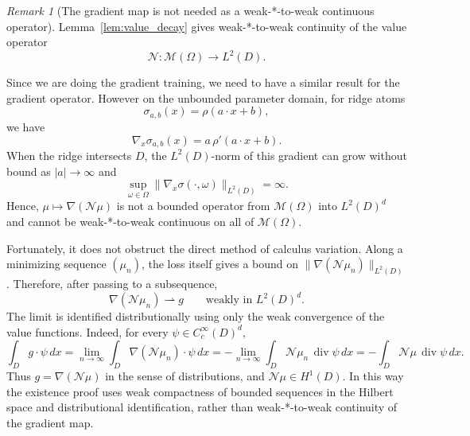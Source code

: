 \documentclass[11pt]{amsart}
\theoremstyle{definition}
\theoremstyle{remark}
\newtheorem{remark}[theorem]{Remark}
\begin{document}
\begin{remark}[The gradient map is not needed as a weak-*-to-weak continuous operator]
Lemma~\ref{lem:value_decay} gives weak-*-to-weak continuity of the value
operator
\begin{equation*}
\mathcal{N} : \mathcal{M}(\Omega) \to L^2(D).
\end{equation*}

Since we are doing the gradient training, we need to have a similar result for the gradient operator. 
However on the unbounded parameter domain, for ridge atoms
\begin{equation*}
\sigma_{a,b}(x) = \rho(a\cdot x+b),
\end{equation*}
we have
\begin{equation*}
\nabla_x \sigma_{a,b}(x) = a\,\rho'(a\cdot x+b).
\end{equation*}
When the ridge intersects $D$, the $L^2(D)$-norm of this gradient can grow
without bound as $|a|\to\infty$ and 
\begin{equation*}
\sup_{\omega\in\Omega}
\|\nabla_x\sigma(\cdot,\omega)\|_{L^2(D)} = \infty.
\end{equation*}
Hence, $\mu \mapsto \nabla(\mathcal{N}\mu)$ is not a bounded operator from
$\mathcal{M}(\Omega)$ into $L^2(D)^d$ and cannot be weak-*-to-weak
continuous on all of $\mathcal{M}(\Omega)$.

Fortunately, it does not obstruct the direct method of calculus variation.  
Along a minimizing sequence $(\mu_n)$, the loss itself gives a bound on
$\|\nabla(\mathcal{N}\mu_n)\|_{L^2(D)}$.  
Therefore, after passing to a subsequence,
\begin{equation*}
\nabla(\mathcal{N}\mu_n) \rightharpoonup g
\qquad \text{weakly in } L^2(D)^d .
\end{equation*}
The limit is identified distributionally using only the weak convergence of the
value functions.  Indeed, for every $\psi \in C_c^\infty(D)^d$,
\begin{equation*}
\int_D g \cdot \psi \, dx
= \lim_{n\to\infty} \int_D \nabla(\mathcal{N}\mu_n)\cdot \psi \, dx
= -\lim_{n\to\infty} \int_D \mathcal{N}\mu_n\,\operatorname{div}\psi \, dx
= -\int_D \mathcal{N}\mu\,\operatorname{div}\psi \, dx .
\end{equation*}
Thus $g = \nabla(\mathcal{N}\mu)$ in the sense of distributions, and
$\mathcal{N}\mu \in H^1(D)$.  In this way the existence proof uses weak
compactness of bounded sequences in the Hilbert space and distributional identification,
rather than weak-*-to-weak continuity of the gradient map.
\end{remark}
\end{document}
